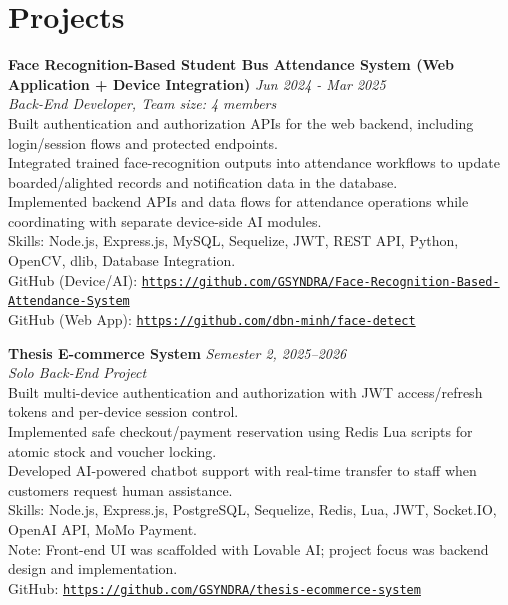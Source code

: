 \section{Projects}

\textbf{Face Recognition-Based Student Bus Attendance System (Web Application + Device Integration)} \hfill \textit{Jun 2024 - Mar 2025}\\
\textit{Back-End Developer, Team size: 4 members}\\
Built authentication and authorization APIs for the web backend, including login/session flows and protected endpoints.\\
Integrated trained face-recognition outputs into attendance workflows to update boarded/alighted records and notification data in the database.\\
Implemented backend APIs and data flows for attendance operations while coordinating with separate device-side AI modules.\\
Skills: Node.js, Express.js, MySQL, Sequelize, JWT, REST API, Python, OpenCV, dlib, Database Integration.\\
GitHub (Device/AI): \href{https://github.com/GSYNDRA/Face-Recognition-Based-Attendance-System}{\nolinkurl{https://github.com/GSYNDRA/Face-Recognition-Based-Attendance-System}}\\
GitHub (Web App): \href{https://github.com/dbn-minh/face-detect}{\nolinkurl{https://github.com/dbn-minh/face-detect}}

\vspace{6pt}
\textbf{Thesis E-commerce System} \hfill \textit{Semester 2, 2025--2026}\\
\textit{Solo Back-End Project}\\
Built multi-device authentication and authorization with JWT access/refresh tokens and per-device session control.\\
Implemented safe checkout/payment reservation using Redis Lua scripts for atomic stock and voucher locking.\\
Developed AI-powered chatbot support with real-time transfer to staff when customers request human assistance.\\
Skills: Node.js, Express.js, PostgreSQL, Sequelize, Redis, Lua, JWT, Socket.IO, OpenAI API, MoMo Payment.\\
Note: Front-end UI was scaffolded with Lovable AI; project focus was backend design and implementation.\\
GitHub: \href{https://github.com/GSYNDRA/thesis-ecommerce-system}{\nolinkurl{https://github.com/GSYNDRA/thesis-ecommerce-system}}
